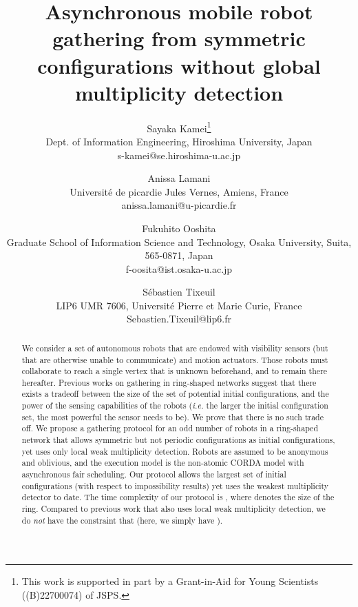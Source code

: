 \documentclass[11pt]{article}
\begin{document}
\title{Asynchronous mobile robot gathering from symmetric configurations without global multiplicity detection}

\author{Sayaka Kamei\footnote{
  This work is supported in part by a Grant-in-Aid for Young
  Scientists ((B)22700074) of JSPS.}\\
   Dept. of Information Engineering, Hiroshima University, Japan \\
 s-kamei@se.hiroshima-u.ac.jp \\
   \and
   Anissa Lamani \\
   Universit\'{e} de picardie Jules Vernes, Amiens, France \\
  anissa.lamani@u-picardie.fr\\
  \and
   Fukuhito Ooshita \\
  Graduate School of Information Science and Technology, Osaka University, Suita, 565-0871, Japan \\
  f-oosita@ist.osaka-u.ac.jp\\
  \and
   S\'{e}bastien Tixeuil \\
  LIP6 UMR 7606, Universit\'{e} Pierre et Marie Curie, France \\
  Sebastien.Tixeuil@lip6.fr
   }

\date{}
\maketitle

\begin{abstract}
We consider a set of  autonomous robots that are endowed with visibility sensors (but that are otherwise unable to communicate) and motion actuators. Those robots must collaborate to reach a single vertex that is unknown beforehand, and to remain there hereafter. Previous works on gathering in ring-shaped networks suggest that there exists a tradeoff between the size of the set of potential initial configurations, and the power of the sensing capabilities of the robots (\emph{i.e.} the larger the initial configuration set, the most powerful the sensor needs to be).
We prove that there is no such trade off. We propose a gathering protocol for an odd number of robots in a ring-shaped network that allows symmetric but not periodic configurations as initial configurations, yet uses only local weak multiplicity detection. Robots are assumed to be anonymous and oblivious, and the execution model is the non-atomic CORDA model with asynchronous fair scheduling. Our protocol allows the largest set of initial configurations (with respect to impossibility results) yet uses the weakest multiplicity detector to date. The time complexity of our protocol is , where  denotes the size of the ring. Compared to previous work that also uses local weak multiplicity detection, we do \emph{not} have the constraint that  (here, we simply have ).
\end{abstract}
\end{document}
